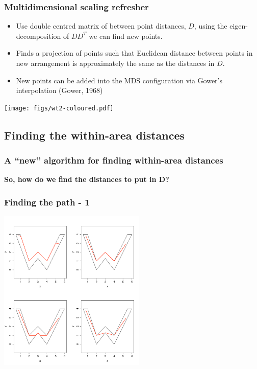 \documentclass[ignorenonframetext]{beamer} %
\newcommand{\bc}{\begin{center}}
\newcommand{\ec}{\end{center}}
\newcommand{\bi}{\begin{itemize}}
\newcommand{\ei}{\end{itemize}}
\begin{document}
\begin{frame}
	\frametitle{Multidimensional scaling refresher}
       \bi
         \item Use double centred matrix of between point distances, $D$, using the eigen-decomposition of $DD^T$ we can find new points.
         \item Finds a projection of points such that Euclidean distance between points in new arrangement is approximately the same as the distances in $D$.
          \item New points can be added into the MDS configuration via Gower's interpolation (Gower, 1968)
        \ei
            \centering
              \texttt{[image: figs/wt2-coloured.pdf]}\\
        
\end{frame}

\subsection{Finding the within-area distances}

\begin{frame}
	\frametitle{A ``new'' algorithm for finding within-area distances}

	\bc \textbf{So, how do we find the distances to put in D?}\ec
\end{frame}

\begin{frame}
	\frametitle{Finding the path - 1}
            \centering
              \includegraphics[width=2.75in]{figs/wood-2}\\
\end{frame}
\end{document}
